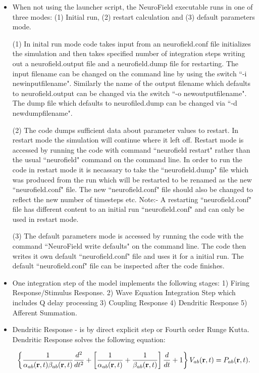 \documentclass[12pt,a4paper]{article}
\begin{document}
\begin{itemize}

\item When not using the launcher script, the NeuroField executable runs in one of three modes: (1) Initial run,
(2) restart calculation and (3) default parameters mode.

(1) In inital run mode
code takes input from an neurofield.conf file
initializes the simulation and then takes specified number of integration steps
writing out a neurofield.output file and a neurofield.dump file for restarting.
The input filename can be changed on the command line by using the switch
``-i newinputfilename". Similarly the name of the output filename which defaults
to neurofield.output can be changed via the switch ``-o newoutputfilename". The
dump file which defaults to neurofiled.dump can be changed via ``-d newdumpfilename".

(2) The code dumps sufficient data about parameter values to restart. In
restart mode the simulation will continue where it left off. Restart mode is
accessed by running the code with command ``neurofield restart" rather than
the usual ``neurofield" command on the command line. In order to run the code in restart
mode it is necassary to take the ``neurofield.dump" file which was produced from
the run which will be restarted to be renamed as the
new ``neurofield.conf" file. The new ``neurofield.conf"
file should also be changed to reflect the new number of timesteps etc.
Note:- A restarting ``neurofield.conf" file has different content to an initial run
``neurofield.conf" and can only be used in restart mode.

(3) The default parameters
mode is accessed by running the code with the command ``NeuroField write defaults"
on the command line. The code then writes it own default ``neurofield.conf" file
and uses it for a initial run. The default ``neurofield.conf" file can be 
inspected after the code finishes.

\item One integration step of the model implements the following stages:
1) Firing Response/Stimulus Response. 2) Wave Equation Integration Step
which includes Q delay processing 3) Coupling Response 4) Dendritic Response
5) Afferent Summation.

\item Dendritic Response - is by direct explicit step or Fourth order Runge Kutta.
Dendritic Response solves the following equation:

\begin{equation}
\left\{ \frac{1}{\alpha_{ab}({\bf r},t)\beta_{ab}({\bf r}, t)} \frac{d^2}{dt^2} +
  \left[ \frac{1}{\alpha_{ab}({\bf r}, t)}+ \frac{1}{\beta_{ab}({\bf r}, t)} 
  \right]
  \frac{d}{dt} + 1
\right\}
V_{ab}({\bf r}, t) = P_{ab}({\bf r}, t).
\end{equation}


\end{itemize}
\end{document}
